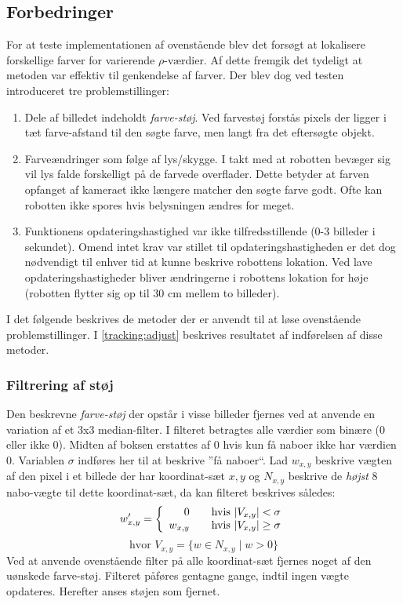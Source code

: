 \subsection{Forbedringer}\label{tracking:improvements}
For at teste implementationen af ovenstående blev det forsøgt at lokalisere forskellige farver for varierende $\rho$-værdier.
Af dette fremgik det tydeligt at metoden var effektiv til genkendelse af farver.
Der blev dog ved testen introduceret tre problemstillinger:
\begin{enumerate}
\item Dele af billedet indeholdt \emph{farve-støj}.
Ved farvestøj forstås pixels der ligger i tæt farve-afstand til den søgte farve, men langt fra det eftersøgte objekt.
\item Farveændringer som følge af lys/skygge.
I takt med at robotten bevæger sig vil lys falde forskelligt på de farvede overflader.
Dette betyder at farven opfanget af kameraet ikke længere matcher den søgte farve godt.
Ofte kan robotten ikke spores hvis belysningen ændres for meget.
\item Funktionens opdateringshastighed var ikke tilfredsstillende (0-3 billeder i sekundet).
Omend intet krav var stillet til opdateringshastigheden er det dog nødvendigt til enhver tid at kunne beskrive robottens lokation.
Ved lave opdateringshastigheder bliver ændringerne i robottens lokation for høje (robotten flytter sig op til 30 cm mellem to billeder).
\end{enumerate}

I det følgende beskrives de metoder der er anvendt til at løse ovenstående problemstillinger.
I \cref{tracking:adjust} beskrives resultatet af indførelsen af disse metoder.

\subsubsection{Filtrering af støj}
Den beskrevne \emph{farve-støj} der opstår i visse billeder fjernes ved at anvende en variation af et 3x3 median-filter\cite{medianfilter}.
I filteret betragtes alle værdier som binære (0 eller ikke 0).
Midten af boksen erstattes af 0 hvis kun få naboer ikke har værdien 0.
Variablen $\sigma$ indføres her til at beskrive ''få naboer``.
Lad $w_{x,y}$ beskrive vægten af den pixel i et billede der har koordinat-sæt $x,y$ og $N_{x,y}$ beskrive de \emph{højst} 8 nabo-vægte til dette koordinat-sæt, da kan filteret beskrives således:
\begin{equation}\label{tracking:eq:filter}
w_{x,y}' = \left\{ 
  \begin{array}{r l}
        0 & \quad \text{hvis $|V_{x,y}| < \sigma$} \\
        w_{x,y} & \quad \text{hvis $|V_{x,y}| \geq \sigma$}
  \end{array} \right.
\end{equation}
$$\text{hvor } V_{x,y} = \{ w \in N_{x,y} \mid w > 0 \}$$
Ved at anvende ovenstående filter på alle koordinat-sæt fjernes noget af den uønskede farve-støj.
Filteret påføres gentagne gange, indtil ingen vægte opdateres.
Herefter anses støjen som fjernet.

